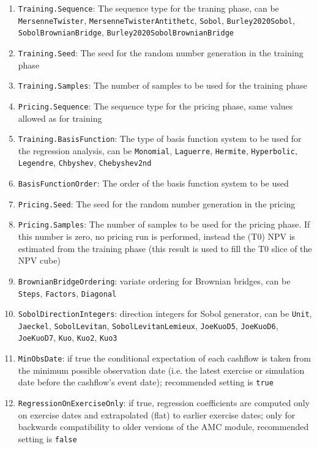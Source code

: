 \begin{enumerate}
\item \verb+Training.Sequence+: The sequence type for the traning phase, can be \verb+MersenneTwister+,
  \verb+MersenneTwisterAntithetc+, \verb+Sobol+, \verb+Burley2020Sobol+, \verb+SobolBrownianBridge+,
  \verb+Burley2020SobolBrownianBridge+
\item \verb+Training.Seed+: The seed for the random number generation in the training phase
\item \verb+Training.Samples+: The number of samples to be used for the training phase
\item \verb+Pricing.Sequence+: The sequence type for the pricing phase, same values allowed as for training
\item \verb+Training.BasisFunction+: The type of basis function system to be used for the regression analysis, can be
  \verb+Monomial+, \verb+Laguerre+, \verb+Hermite+, \verb+Hyperbolic+, \verb+Legendre+, \verb+Chbyshev+,
  \verb+Chebyshev2nd+
\item \verb+BasisFunctionOrder+: The order of the basis function system to be used
\item \verb+Pricing.Seed+: The seed for the random number generation in the pricing
\item \verb+Pricing.Samples+: The number of samples to be used for the pricing phase. If this number is zero, no pricing
  run is performed, instead the (T0) NPV is estimated from the training phase (this result is used to fill the T0 slice
  of the NPV cube)
\item \verb+BrownianBridgeOrdering+: variate ordering for Brownian bridges, can be \verb+Steps+, \verb+Factors+,
  \verb+Diagonal+
\item \verb+SobolDirectionIntegers+: direction integers for Sobol generator, can be \verb+Unit+, \verb+Jaeckel+,
  \verb+SobolLevitan+, \verb+SobolLevitanLemieux+, \verb+JoeKuoD5+, \verb+JoeKuoD6+, \verb+JoeKuoD7+,
  \verb+Kuo+, \verb+Kuo2+, \verb+Kuo3+
\item \verb+MinObsDate+: if true the conditional expectation of each cashflow is taken from the minimum possible
  observation date (i.e. the latest exercise or simulation date before the cashflow's event date); recommended setting
  is \verb+true+
\item \verb+RegressionOnExerciseOnly+: if true, regression coefficients are computed only on exercise dates and
  extrapolated (flat) to earlier exercise dates; only for backwards compatibility to older versions of the AMC module,
  recommended setting is \verb+false+
\end{enumerate}

